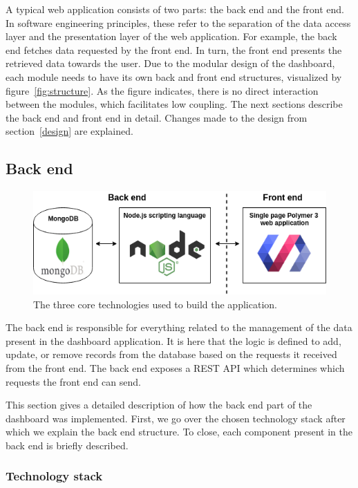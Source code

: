    A typical web application consists of two parts: the back end and the front end. In software engineering principles, these refer to the separation of the data access layer and the presentation layer of the web application. For example, the back end fetches data requested by the front end. In turn, the front end presents the retrieved data towards the user. Due to the modular design of the dashboard, each module needs to have its own back and front end structures, visualized by figure~\ref{fig:structure}. As the figure indicates, there is no direct interaction between the modules, which facilitates low coupling. The next sections describe the back end and front end in detail. Changes made to the design from section~\ref{design} are explained.

    \subsection{Back end}

    \begin{figure}[!t]
        \centering
        \includegraphics[width=1\textwidth]{chapters/4_implementation/tech}
        \caption{The three core technologies used to build the application.}\label{fig:tech}
    \end{figure}

    The back end is responsible for everything related to the management of the data present in the dashboard application. It is here that the logic is defined to add, update, or remove records from the database based on the requests it received from the front end. The back end exposes a REST API which determines which requests the front end can send.

    This section gives a detailed description of how the back end part of the dashboard was implemented. First, we go over the chosen technology stack after which we explain the back end structure. To close, each component present in the back end is briefly described.

        \subsubsection{Technology stack}

